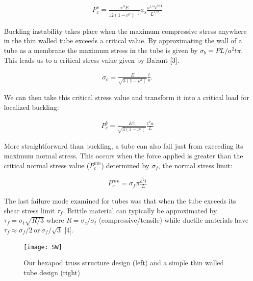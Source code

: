 \documentclass[final]{svjour2}
\begin{document}
\begin{eqnarray}
P_{c}^{s} = \frac{\pi^3E}{12(1-\nu^2)^{-\frac{5}{8}}}a_{s}\frac{a^{1/4}t^{9/4}}{L^{1/2}}
\end{eqnarray}

Buckling instability takes place when the maximum compressive stress anywhere in the thin walled tube exceeds a critical value.  By approximating the wall of a tube as a membrane the maximum stress in the tube is given by $\sigma_{b} = PL/a^2t\pi$. This leads us to a critical stress value given by Ba$\check{z}$ant [3].

\begin{eqnarray}
\sigma_{c}=\frac{E}{\sqrt{3(1-\nu^2)}}\frac{t}{a}.
\end{eqnarray}

We can then take this critical stress value and transform it into a critical load for localized buckling:

\begin{eqnarray}
P_{c}^{b} = \frac{E \pi}{\sqrt{3(1-\nu^2)}}\frac{t^2a}{L}
\end{eqnarray}

More straightforward than buckling, a tube can also fail just from exceeding its maximum normal stress. This occurs when the force applied is greater than the critical normal stress value ($P_{c}^{mn}$) determined by $\sigma_{f}$, the normal stress limit:

\begin{eqnarray}
P_{c}^{mn} = \sigma_{f} \pi \frac{a^2t}{L}
\end{eqnarray}

The last failure mode examined for tubes was that when the tube exceeds its shear stress limit $\tau_{f}$. Brittle material can typically be approximated by $\tau_{f} = \sigma_{t}\sqrt{R/3} $ where $R = \sigma_{c}/\sigma_{t}$ (compressive/tensile) while ductile materials have $\tau_{f} \approx \sigma_{f}/2 \ \text{or} \ \sigma_{f}/\sqrt{3}$ [4].

\begin{figure}[!ht]
\begin{center}
\texttt{[image: SW]}
\end{center}
\caption{Our hexapod truss structure design (left) and a simple thin walled tube design (right)}
\label{SW}
\end{figure}
\end{document}
